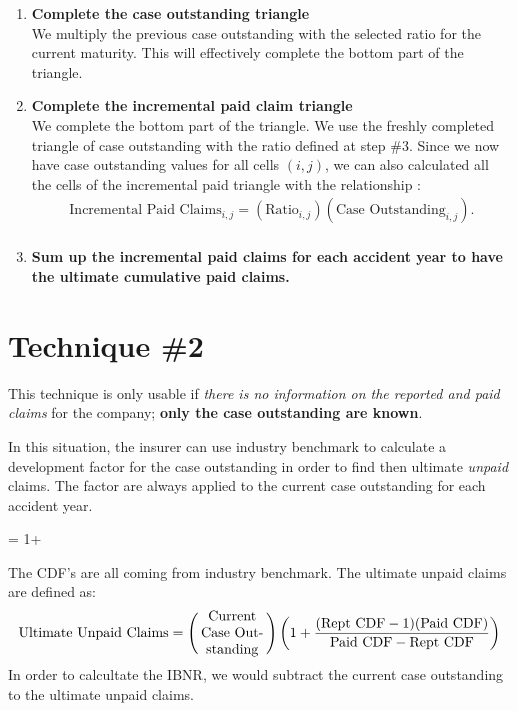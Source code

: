 \documentclass[11pt, english]{memoir}
\numberwithin{definition}{section}
\begin{document}
\begin{enumerate}
		\item \textbf{Complete the case outstanding triangle}\\
		We multiply the previous case outstanding with the selected ratio for the current maturity. This will effectively complete the bottom part of the triangle. \\
		
		
		
		\item \textbf{Complete the incremental paid claim triangle}\\
		We complete the bottom part of the triangle. We use the freshly completed triangle of case outstanding with the ratio defined at step \#3. Since we now have case outstanding values for all cells $ (i,j) $, we can also calculated all the cells of the incremental paid triangle with the relationship : 
		\begin{align*}
		\text{Incremental Paid Claims}_{i,j} = \left(\text{Ratio}_{i,j}\right) \left(\text{Case Outstanding}_{i,j}\right).\\
		\end{align*}
		
		
		\item \textbf{Sum up the incremental paid claims for each accident year to have the ultimate cumulative paid claims.}\\
	\end{enumerate}



\section{Technique \#2}
This technique is only usable if \emph{there is no information on the reported and paid claims} for the company; \textbf{only the case outstanding are known}.

In this situation, the insurer can use industry benchmark to calculate a development factor for the case outstanding in order to find then ultimate \emph{unpaid} claims. The factor are always applied to the current case outstanding for each accident year. 
\begin{tcolorbox}
 = 1+  
\end{tcolorbox}
The CDF's are all coming from industry benchmark. The ultimate unpaid claims are defined as:
\begin{align*}
\text{Ultimate Unpaid Claims} = 
\left( \begin{minipage}{0.14\linewidth}\centering
Current Case Outstanding
\end{minipage}\right)
\left(1+ \frac{(\text{Rept CDF} - 1)(\text{Paid CDF})}{\text{Paid CDF} - \text{Rept CDF}}  \right)
\end{align*}	
In order to calcultate the IBNR, we would subtract the current case outstanding to the ultimate unpaid claims. 
\end{document}
